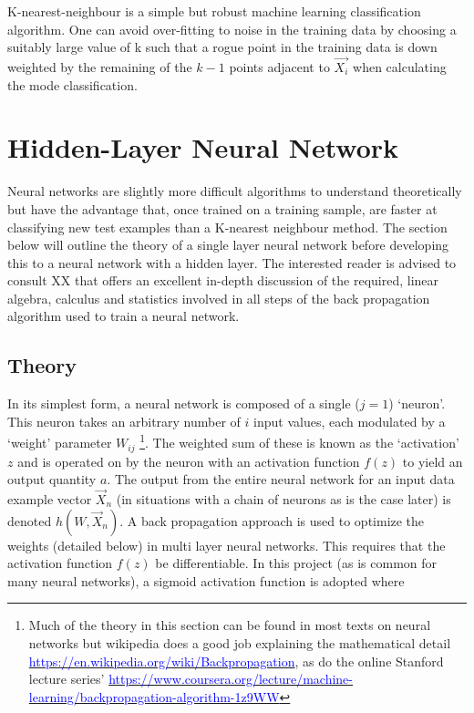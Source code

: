 \documentclass[10pt]{article}
\begin{document}
K-nearest-neighbour is a simple but robust machine learning classification algorithm. One can avoid over-fitting to noise in the training data by choosing a suitably large value of k such that a rogue point in the training data is down weighted by the remaining of the $k-1$ points adjacent to $\vec{X_i}$ when calculating the mode classification.








\section{Hidden-Layer Neural Network}
\label{sec_nn}

Neural networks are slightly more difficult algorithms to understand theoretically but have the advantage that, once trained on a training sample, are faster at classifying new test examples than a K-nearest neighbour method.  The section below will outline the theory of a single layer neural network before developing this to a neural network with a hidden layer. The interested reader is advised to consult XX that offers an excellent in-depth discussion of the required, linear algebra, calculus and statistics involved in all steps of the back propagation algorithm used to train a neural network.

\subsection{Theory} 


In its simplest form, a neural network is composed of a single ($j=1$) `neuron'. This neuron takes an arbitrary number of $i$ input values, each modulated by a `weight' parameter $W_{ij}$ \footnote{Much of the theory in this section can be found in most texts on neural networks but wikipedia does a good job explaining the mathematical detail \href{ https://en.wikipedia.org/wiki/Backpropagation}{\textcolor{blue}{https://en.wikipedia.org/wiki/Backpropagation}}, as do the online Stanford lecture series' \href{ https://www.coursera.org/lecture/machine-learning/backpropagation-algorithm-1z9WW}{\textcolor{blue}{https://www.coursera.org/lecture/machine-learning/backpropagation-algorithm-1z9WW}}}. The weighted sum of these is known as the `activation' $z$ and is operated on by the neuron with an activation function $f (z)$ to yield an output quantity $a$. The output from the entire neural network for an input data example vector $\vec{X}_n$ (in situations with a chain of neurons as is the case later) is denoted $h(W,\vec{X}_n)$. A back propagation approach is used to optimize the weights (detailed below) in multi layer neural networks. This requires that the activation function $f(z)$ be differentiable. In this project (as is common for many neural networks), a sigmoid activation function is adopted where 
\end{document}
